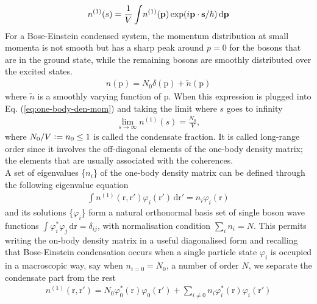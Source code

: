\documentclass[12pt,a4paper,twosides]{book}
\renewcommand{\vec}[1]{\bm{\mathrm{#1}}}
\begin{document}
			\begin{align}
				n^{(1)}(s) = \frac{1}{V}\int \! n^{(1)}\qty(\vec{p})\exp(i\vec{p}\cdot\vec{s}/\hbar)\,\mathrm{d}\vec{p} \label{eq:one-body-den-mom}
			\end{align}
			For a Bose-Einstein condensed system, the momentum distribution at small momenta is not smooth but has a sharp peak around $p=0$ for the bosons that are in the ground state, while the remaining bosons are smoothly distributed over the excited states.
			\begin{align}
				n(\vec{p})=N_0\delta(\vec{p})+\tilde{n}(\vec{p})
			\end{align}
			where $\tilde{n}$ is a smoothly varying function of $\vec{p}$. When this expression is plugged into Eq. (\ref{eq:one-body-den-mom}) and taking the limit where $s$ goes to infinity
			\begin{align}
				\lim_{s\rightarrow\infty}n^{(1)}(s)=\frac{N_0}{V},
			\end{align}
			where $N_0/V \vcentcolon= n_0\leq 1$ is called the condensate fraction. It is called long-range order since it involves the off-diagonal elements of the one-body density matrix; the elements that are usually associated with the coherences.\\
			
			A set of eigenvalues \{$n_i$\} of the one-body density matrix can be defined through the following eigenvalue equation
			\begin{align}
				\int \! n^{(1)}(\vec{r},\vec{r'})\varphi_i(\vec{r'}) \,\mathrm{d}\vec{r'} = n_i\varphi_i(\vec{r})
			\end{align}
			and its solutions \{$\varphi_i$\} form a natural orthonormal basis set of single boson wave functions $\int\!\varphi_i^*\varphi_j\,\mathrm{d}\vec{r}=\delta_{ij}$, with normalisation condition $\sum_i n_i=N$. This permits writing the on-body density matrix in a useful diagonalised form and recalling that Bose-Einstein condensation occurs when a single particle state $\varphi_i$ is occupied in a macroscopic way, say when $n_{i=0}=N_0$, a number of order $N$, we separate the condensate part from the rest
			\begin{align}
				n^{(1)}(\vec{r},\vec{r'}) = N_0\varphi_0^*(\vec{r})\varphi_0(\vec{r'})+\sum_{i\neq0}n_i\varphi_i^*(\vec{r})\varphi_i(\vec{r'}) \label{eq:obdm-diag}
			\end{align}
\end{document}
